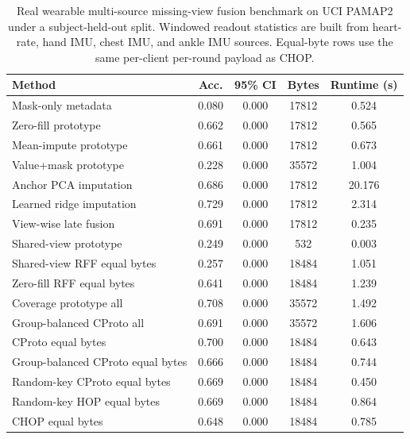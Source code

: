 \begin{table}[t]
\centering
\caption{Real wearable multi-source missing-view fusion benchmark on UCI PAMAP2 under a subject-held-out split. Windowed readout statistics are built from heart-rate, hand IMU, chest IMU, and ankle IMU sources. Equal-byte rows use the same per-client per-round payload as CHOP.}
\label{tab:if-pamap2-fusion}
\scriptsize
\setlength{\tabcolsep}{3pt}
\renewcommand{\arraystretch}{0.94}
\begin{tabular}{lcccc}
\toprule
Method & Acc. & 95\% CI & Bytes & Runtime (s) \\
\midrule
Mask-only metadata & 0.080 & 0.000 & 17812 & 0.524 \\
Zero-fill prototype & 0.662 & 0.000 & 17812 & 0.565 \\
Mean-impute prototype & 0.661 & 0.000 & 17812 & 0.673 \\
Value+mask prototype & 0.228 & 0.000 & 35572 & 1.004 \\
Anchor PCA imputation & 0.686 & 0.000 & 17812 & 20.176 \\
Learned ridge imputation & 0.729 & 0.000 & 17812 & 2.314 \\
View-wise late fusion & 0.691 & 0.000 & 17812 & 0.235 \\
Shared-view prototype & 0.249 & 0.000 & 532 & 0.003 \\
Shared-view RFF equal bytes & 0.257 & 0.000 & 18484 & 1.051 \\
Zero-fill RFF equal bytes & 0.641 & 0.000 & 18484 & 1.239 \\
Coverage prototype all & 0.708 & 0.000 & 35572 & 1.492 \\
Group-balanced CProto all & 0.691 & 0.000 & 35572 & 1.606 \\
CProto equal bytes & 0.700 & 0.000 & 18484 & 0.643 \\
Group-balanced CProto equal bytes & 0.666 & 0.000 & 18484 & 0.744 \\
Random-key CProto equal bytes & 0.669 & 0.000 & 18484 & 0.450 \\
Random-key HOP equal bytes & 0.669 & 0.000 & 18484 & 0.864 \\
CHOP equal bytes & 0.648 & 0.000 & 18484 & 0.785 \\
\bottomrule
\end{tabular}
\end{table}
